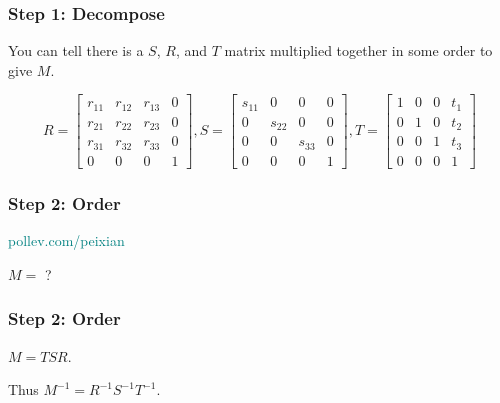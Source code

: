 \documentclass{beamer}
\begin{document}
\begin{frame}
    \frametitle{Step 1: Decompose}

    You can tell there is a $S$, $R$, and $T$ matrix multiplied together in some order to give $M$.

    $$ R = 
    \left[
    \begin{matrix}
        r_{11} & r_{12} & r_{13} & 0\\
        r_{21} & r_{22} & r_{23} & 0\\
        r_{31} & r_{32} & r_{33} & 0\\
        0 & 0 & 0 & 1
    \end{matrix}
    \right],
    S =
    \left[
    \begin{matrix}
        s_{11} & 0 & 0 & 0\\
        0 & s_{22} & 0 & 0\\
        0 & 0 & s_{33} & 0\\
        0 & 0 & 0 & 1
    \end{matrix}
    \right],
    T =
    \left[
    \begin{matrix}
        1 & 0 & 0 & t_1\\
        0 & 1 & 0 & t_2\\
        0 & 0 & 1 & t_3\\
        0 & 0 & 0 & 1
    \end{matrix}
    \right]
    $$

\end{frame}

\begin{frame}
    \frametitle{Step 2: Order}

    \begin{tcolorbox}[colback=teal!5!white]
        \textcolor{teal}{pollev.com/peixian}
    \end{tcolorbox}
    
    $M =$ ?

\end{frame}

\begin{frame}
    \frametitle{Step 2: Order}

    $M = TSR$.

    \vspace{1em}

    Thus $M^{-1} = R^{-1} S^{-1} T^{-1}$.

\end{frame}
\end{document}
